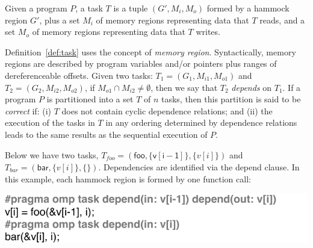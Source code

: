 \documentclass[sigplan,10pt,screen]{acmart}
\begin{document}
\begin{definition}[Task]
\label{def:task}
Given a program $P$, a task $T$ is a tuple $(G', M_i, M_o)$ formed by a hammock
region $G'$, plus a set $M_i$ of memory regions representing data that $T$ reads,
and a set $M_o$ of memory regions representing data that $T$ writes.
\end{definition}

Definition~\ref{def:task} uses the concept of {\em memory region}.
Syntactically, memory regions are described by program variables and/or pointers
plus ranges of dereferenceable offsets.
Given two tasks: $T_1 = (G_1, M_{i1}, M_{o1})$ and $T_2 = (G_2, M_{i2}, M_{o2})$,
if $M_{o1} \cap M_{i2} \neq \emptyset$, then we say that $T_2$ {\em depends} on
$T_1$.
If a program $P$ is partitioned into a set $T$ of $n$ tasks, then this partition is
said to be {\em correct} if:
(i) $T$ does not contain cyclic dependence relations; and
(ii) the execution of the tasks in $T$ in any ordering determined by dependence
relations leads to the same results as the sequential execution of $P$.

\begin{example}
\label{ex:regions}
Below we have two tasks, $T_{\mathit{foo}} = (\mathsf{foo}, \{\mathsf{v[i - 1]}\},
\{v[i]\})$ and $T_{\mathit{bar}} = (\mathsf{bar}, \{v[i]\}, \{\})$.
Dependencies are identified via the \textsf{depend} clause.
In this example, each hammock region is formed by one function call:
\end{example}

\includegraphics[width=1\columnwidth]{images/ex_depends}
\end{document}
